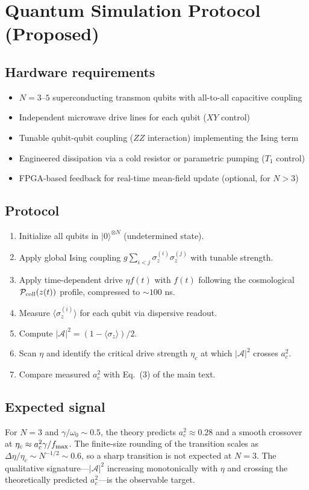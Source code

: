 \documentclass[aps,prd,onecolumn]{revtex4-2}
\begin{document}
\section{Quantum Simulation Protocol (Proposed)}

\subsection{Hardware requirements}

\begin{itemize}
\item $N = 3$--$5$ superconducting transmon qubits with all-to-all capacitive coupling
\item Independent microwave drive lines for each qubit ($XY$ control)
\item Tunable qubit-qubit coupling ($ZZ$ interaction) implementing the Ising term
\item Engineered dissipation via a cold resistor or parametric pumping ($T_1$ control)
\item FPGA-based feedback for real-time mean-field update (optional, for $N > 3$)
\end{itemize}

\subsection{Protocol}

\begin{enumerate}
\item Initialize all qubits in $|0\rangle^{\otimes N}$ (undetermined state).
\item Apply global Ising coupling $g\sum_{i<j}\sigma_z^{(i)}\sigma_z^{(j)}$ with tunable strength.
\item Apply time-dependent drive $\eta f(t)$ with $f(t)$ following the cosmological $\mathcal{P}_{\rm coll}(z(t))$ profile, compressed to $\sim 100$ ns.
\item Measure $\langle\sigma_z^{(i)}\rangle$ for each qubit via dispersive readout.
\item Compute $|\mathcal{A}|^2 = (1 - \langle\sigma_z\rangle)/2$.
\item Scan $\eta$ and identify the critical drive strength $\eta_c$ at which $|\mathcal{A}|^2$ crosses $a_c^2$.
\item Compare measured $a_c^2$ with Eq.~(3) of the main text.
\end{enumerate}

\subsection{Expected signal}

For $N=3$ and $\gamma/\omega_0 \sim 0.5$, the theory predicts $a_c^2 \approx 0.28$ and a smooth crossover at $\eta_c \approx a_c^2\gamma/f_{\rm max}$. The finite-size rounding of the transition scales as $\Delta \eta/\eta_c \sim N^{-1/2} \sim 0.6$, so a sharp transition is not expected at $N=3$. The qualitative signature---$|\mathcal{A}|^2$ increasing monotonically with $\eta$ and crossing the theoretically predicted $a_c^2$---is the observable target.
\end{document}
